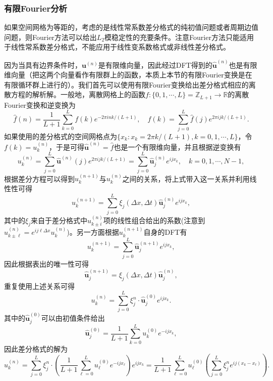 \documentclass[a4paper,10pt]{ctexart}
\begin{document}
\subsubsection{有限Fourier分析}
如果空间网格为等距的，考虑的是线性常系数差分格式的纯初值问题或者周期边值问题，则Fourier方法可以给出$ L_2 $模稳定性的充要条件。注意Fourier方法只能适用于线性常系数差分格式，不能应用于线性变系数格式或非线性差分格式。

因为当具有边界条件时，$ \bm{u}^{(n)} $是有限维向量，因此经过DFT得到的$ \hat{\bm{u}}^{(n)} $也是有限维向量（把这两个向量看作有限群上的函数，本质上本节的有限Fourier变换是在有限循环群上进行的）。我们首先可以使用有限Fourier变换给出差分格式相应的离散方程的解析解。一般地，离散网格上的函数$ f:\{0,1,\cdots ,L\} = \mathbb{Z}_{L+1}\to \mathbb{R} $的离散Fourier变换和逆变换为
\begin{equation}
    \hat{f}(n) = \frac{1}{L+1}\sum_{k=0}^{L} f(k)e^{-2\pi i n k/(L+1)},\quad f(k) = \sum_{j=0}^{L} \hat{f}(j)e^{2\pi ijk/(L+1)}.
\end{equation}
如果使用的差分格式的空间网格点为$ \{x_k:x_k=2\pi k / (L+1), k=0,1,\cdots ,L\} $，令$ f(k) = u^{(n)}_k $，于是可得$ \hat{\bm{u}}^{(n)} = \hat{f} $也是一个有限维向量，并且根据逆变换有
\begin{equation}
    u^{(n)}_k = \sum_{j=0}^{L} \hat{\bm{u}}^{(n)}(j)e^{2 \pi ij k / (L+1)} = \sum_{j=0}^{L} \hat{\bm{u}}^{(n)}_je^{ijx_k},\quad k=0,1,\cdots ,N-1,
\end{equation}
根据差分方程可以得到$ u^{(n+1)}_k $与$ u^{(n)}_k $之间的关系，将上式带入这一关系并利用线性性可得
\[
    u_k^{(n+1)} = \sum_{j=0}^L \xi_j(\Delta x, \Delta t) \hat{\bm{u}}^{(n)}_j e^{ijx_k},
\]
其中的$ \xi_j $来自于差分格式中$ u^{(n)}_{k\pm i} $项的线性组合给出的系数(注意到$ u^{(n)}_{k\pm \ell} = e^{ij\ell \Delta x} u^{(n)}_k $)。另一方面根据$ u^{(n+1)}_k $自身的DFT有
\[
    u^{(n+1)}_k = \sum_{j=0}^L \hat{\bm{u}}^{(n+1)}_j e^{ijx_k},
\]
因此根据表出的唯一性可得
\[
    \hat{\bm{u}}^{(n+1)}_j = \xi_j(\Delta x, \Delta t) \hat{\bm{u}}^{(n)}_j,
\]
重复使用上述关系可得
\begin{equation}
    u^{(n)}_k = \sum_{j=0}^L \xi_j^n\cdot \hat{\bm{u}}^{(0)}_j e^{ijx_k}.
\end{equation}
其中的$ \hat{\bm{u}}^{(0)}_j $可以由初值条件给出
\[
    \hat{\bm{u}}^{(0)}_j = \frac{1}{L+1}\sum_{k=0}^L u^{(0)}_k e^{-ijx_k},
\]
因此差分格式的解为
\begin{equation}
    u^{(n)}_k = \sum_{j=0}^L \xi_j^n\cdot \left( \frac{1}{L+1}\sum_{\ell=0}^L u^{(0)}_\ell e^{-ijx_\ell} \right) e^{ijx_k} = \frac{1}{L+1}\sum_{\ell=0}^L u^{(0)}_\ell \left( \sum_{j=0}^L \xi_j^n e^{ij(x_k-x_\ell)} \right).
\end{equation}
\end{document}
